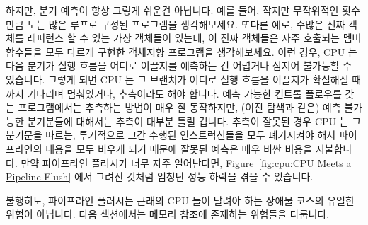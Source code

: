 하지만, 분기 예측이 항상 그렇게 쉬운건 아닙니다.
예를 들어, 작지만 무작위적인 횟수만큼 도는 많은 루프로 구성된 프로그램을
생각해보세요.
또다른 예로, 수많은 진짜 객체를 레퍼런스 할 수 있는 가상 객체들이 있는데, 이
진짜 객체들은 자주 호출되는 멤버 함수들을 모두 다르게 구현한 객체지향
프로그램을 생각해보세요.
이런 경우, CPU 는 다음 분기가 실행 흐름을 어디로 이끌지를 예측하는 건 어렵거나
심지어 불가능할 수 있습니다.
그렇게 되면 CPU 는 그 브랜치가 어디로 실행 흐름을 이끌지가 확실해질 때까지
기다리며 멈춰있거나, 추측이라도 해야 합니다.
예측 가능한 컨트롤 플로우를 갖는 프로그램에서는 추측하는 방법이 매우 잘
동작하지만, (이진 탐색과 같은) 예측 불가능한 분기분들에 대해서는 추측이 대부분
틀릴 겁니다.
추측이 잘못된 경우 CPU 는 그 분기문을 따르는, 투기적으로 그간 수행된
인스트럭션들을 모두 폐기시켜야 해서 파이프라인의 내용을 모두 비우게 되기 때문에
잘못된 예측은 매우 비싼 비용을 지불합니다.
만약 파이프라인 플러시가 너무 자주 일어난다면,
Figure~\ref{fig:cpu:CPU Meets a Pipeline Flush} 에서 그려진 것처럼 엄청난 성능
하락을 겪을 수 있습니다.

불행히도, 파이프라인 플러시는 근래의 CPU 들이 달려야 하는 장애물 코스의 유일한
위험이 아닙니다.
다음 섹션에서는 메모리 참조에 존재하는 위험들을 다룹니다.

